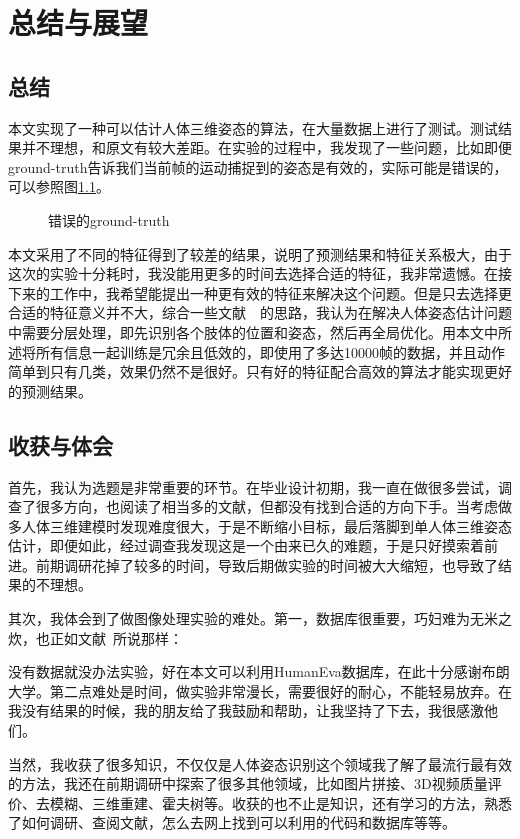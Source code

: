 

\chapter{总结与展望}
\section{总结}
本文实现了一种可以估计人体三维姿态的算法，在大量数据上进行了测试。测试结果并不理想，和原文有较大差距。在实验的过程中，我发现了一些问题，比如即便ground-truth告诉我们当前帧的运动捕捉到的姿态是有效的，实际可能是错误的，可以参照图\ref{fig:wrong}。
\begin{figure}[H]
  \centering
  \caption{错误的ground-truth}\label{fig:wrong}
\end{figure}

本文采用了不同的特征得到了较差的结果，说明了预测结果和特征关系极大，由于这次的实验十分耗时，我没能用更多的时间去选择合适的特征，我非常遗憾。在接下来的工作中，我希望能提出一种更有效的特征来解决这个问题。但是只去选择更合适的特征意义并不大，综合一些文献~\cite{ramanan2007learning}~\cite{yang2011articulated}的思路，我认为在解决人体姿态估计问题中需要分层处理，即先识别各个肢体的位置和姿态，然后再全局优化。用本文中所述将所有信息一起训练是冗余且低效的，即使用了多达10000帧的数据，并且动作简单到只有几类，效果仍然不是很好。只有好的特征配合高效的算法才能实现更好的预测结果。

\section{收获与体会}
首先，我认为选题是非常重要的环节。在毕业设计初期，我一直在做很多尝试，调查了很多方向，也阅读了相当多的文献，但都没有找到合适的方向下手。当考虑做多人体三维建模时发现难度很大，于是不断缩小目标，最后落脚到单人体三维姿态估计，即便如此，经过调查我发现这是一个由来已久的难题，于是只好摸索着前进。前期调研花掉了较多的时间，导致后期做实验的时间被大大缩短，也导致了结果的不理想。

其次，我体会到了做图像处理实验的难处。第一，数据库很重要，巧妇难为无米之炊，也正如文献~\cite{gkiox2013ariarticulated}所说那样：\\
\begin{center}
\end{center}
没有数据就没办法实验，好在本文可以利用HumanEva数据库，在此十分感谢布朗大学。第二点难处是时间，做实验非常漫长，需要很好的耐心，不能轻易放弃。在我没有结果的时候，我的朋友给了我鼓励和帮助，让我坚持了下去，我很感激他们。

当然，我收获了很多知识，不仅仅是人体姿态识别这个领域我了解了最流行最有效的方法，我还在前期调研中探索了很多其他领域，比如图片拼接、3D视频质量评价、去模糊、三维重建、霍夫树等。收获的也不止是知识，还有学习的方法，熟悉了如何调研、查阅文献，怎么去网上找到可以利用的代码和数据库等等。